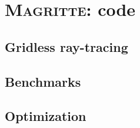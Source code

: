 \chapter{\textsc{Magritte:} code}
\label{Chapter3}


\section{Gridless ray-tracing}

\section{Benchmarks}

\section{Optimization}
